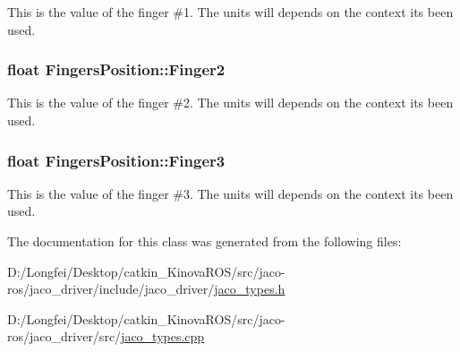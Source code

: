 This is the value of the finger \#1. The units will depends on the context it\textquotesingle{}s been used. 

\subsubsection[{\texorpdfstring{Finger2}{Finger2}}]{\setlength{\rightskip}{0pt plus 5cm}float Fingers\+Position\+::\+Finger2\hspace{0.3cm}{\ttfamily [inherited]}}\hypertarget{structFingersPosition_a0ec9675672721d61fb13bbc2db3d3ef9}{}\label{structFingersPosition_a0ec9675672721d61fb13bbc2db3d3ef9}


This is the value of the finger \#2. The units will depends on the context it\textquotesingle{}s been used. 

\subsubsection[{\texorpdfstring{Finger3}{Finger3}}]{\setlength{\rightskip}{0pt plus 5cm}float Fingers\+Position\+::\+Finger3\hspace{0.3cm}{\ttfamily [inherited]}}\hypertarget{structFingersPosition_a03c819e4c20367e36e62a864bf829160}{}\label{structFingersPosition_a03c819e4c20367e36e62a864bf829160}


This is the value of the finger \#3. The units will depends on the context it\textquotesingle{}s been used. 



The documentation for this class was generated from the following files\+:\begin{DoxyCompactItemize}
\item 
D\+:/\+Longfei/\+Desktop/catkin\+\_\+\+Kinova\+R\+O\+S/src/jaco-\/ros/jaco\+\_\+driver/include/jaco\+\_\+driver/\hyperlink{jaco__types_8h}{jaco\+\_\+types.\+h}\item 
D\+:/\+Longfei/\+Desktop/catkin\+\_\+\+Kinova\+R\+O\+S/src/jaco-\/ros/jaco\+\_\+driver/src/\hyperlink{jaco__types_8cpp}{jaco\+\_\+types.\+cpp}\end{DoxyCompactItemize}
